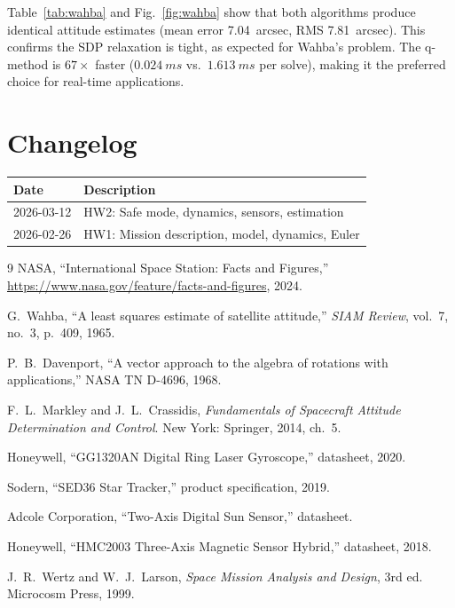 \documentclass[conference]{IEEEtran}
\begin{document}
Table~\ref{tab:wahba} and Fig.~\ref{fig:wahba} show that both algorithms
produce identical attitude estimates (mean error \SI{7.04}{arcsec}, RMS
\SI{7.81}{arcsec}).  This confirms the SDP relaxation is tight, as expected
for Wahba's problem.  The q-method is $67\times$ faster ($\SI{0.024}{ms}$
vs.\ $\SI{1.613}{ms}$ per solve), making it the preferred choice for
real-time applications.

\section{Changelog}

\begin{table}[h]
\centering
\begin{tabular}{@{}ll@{}}
\toprule
\textbf{Date} & \textbf{Description} \\
\midrule
2026-03-12 & HW2: Safe mode, dynamics, sensors, estimation \\
2026-02-26 & HW1: Mission description, model, dynamics, Euler \\
\bottomrule
\end{tabular}
\end{table}

\begin{thebibliography}{9}
NASA, ``International Space Station: Facts and Figures,''
\url{https://www.nasa.gov/feature/facts-and-figures}, 2024.

G.~Wahba, ``A least squares estimate of satellite attitude,''
\textit{SIAM Review}, vol.~7, no.~3, p.~409, 1965.

P.~B.~Davenport, ``A vector approach to the algebra of rotations
with applications,'' NASA TN D-4696, 1968.

F.~L.~Markley and J.~L.~Crassidis,
\textit{Fundamentals of Spacecraft Attitude Determination and Control}.
New York: Springer, 2014, ch.~5.

Honeywell, ``GG1320AN Digital Ring Laser Gyroscope,'' datasheet, 2020.

Sodern, ``SED36 Star Tracker,'' product specification, 2019.

Adcole Corporation, ``Two-Axis Digital Sun Sensor,'' datasheet.

Honeywell, ``HMC2003 Three-Axis Magnetic Sensor Hybrid,'' datasheet, 2018.

J.~R.~Wertz and W.~J.~Larson,
\textit{Space Mission Analysis and Design}, 3rd ed.
Microcosm Press, 1999.
\end{thebibliography}
\end{document}
